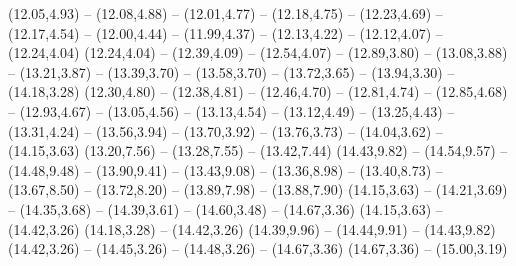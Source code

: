 {  (12.05,4.93) -- (12.08,4.88) -- (12.01,4.77) -- (12.18,4.75) -- (12.23,4.69) -- (12.17,4.54) -- (12.00,4.44) -- (11.99,4.37) -- (12.13,4.22) -- (12.12,4.07) -- (12.24,4.04)
  (12.24,4.04) -- (12.39,4.09) -- (12.54,4.07) -- (12.89,3.80) -- (13.08,3.88) -- (13.21,3.87) -- (13.39,3.70) -- (13.58,3.70) -- (13.72,3.65) -- (13.94,3.30) -- (14.18,3.28)
  (12.30,4.80) -- (12.38,4.81) -- (12.46,4.70) -- (12.81,4.74) -- (12.85,4.68) -- (12.93,4.67) -- (13.05,4.56) -- (13.13,4.54) -- (13.12,4.49) -- (13.25,4.43) -- (13.31,4.24) -- (13.56,3.94) -- (13.70,3.92) -- (13.76,3.73) -- (14.04,3.62) -- (14.15,3.63)
  (13.20,7.56) -- (13.28,7.55) -- (13.42,7.44)
  (14.43,9.82) -- (14.54,9.57) -- (14.48,9.48) -- (13.90,9.41) -- (13.43,9.08) -- (13.36,8.98) -- (13.40,8.73) -- (13.67,8.50) -- (13.72,8.20) -- (13.89,7.98) -- (13.88,7.90)
  (14.15,3.63) -- (14.21,3.69) -- (14.35,3.68) -- (14.39,3.61) -- (14.60,3.48) -- (14.67,3.36)
  (14.15,3.63) -- (14.42,3.26)
  (14.18,3.28) -- (14.42,3.26)
  (14.39,9.96) -- (14.44,9.91) -- (14.43,9.82)
  (14.42,3.26) -- (14.45,3.26) -- (14.48,3.26) -- (14.67,3.36)
  (14.67,3.36) -- (15.00,3.19)}

\def\GeoKoordinaten{%
  \coordinate (Roma) at (6.38,5.11);%
  \coordinate (Londinium) at (4.24,8.08);%
  \coordinate (ColoniaAgrippina) at (5.48,7.74);%
  \coordinate (AugustaTreverorum) at (5.39,7.41);%
  \coordinate (Carthago) at (5.83,3.71);%
  \coordinate (Alexandria) at (10.51,2.34);%
  \coordinate (Athenae) at (8.84,4.06);%
  \coordinate (Antiochia) at (11.69,4.01);%
  \coordinate (Byzantium) at (9.88,5.04);%
  \coordinate (Lugdunum) at (4.91,6.32);%
  \coordinate (Hierosolyma) at (11.74,2.73);%
  \coordinate (Augusta) at (6.15,6.95);%
}
